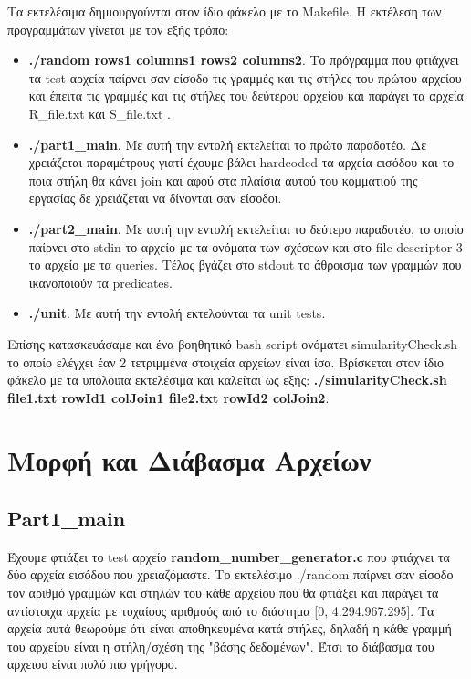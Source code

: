 \documentclass[12pt, a4paper]{article}
\begin{document}
Τα εκτελέσιμα δημιουργούνται στον ίδιο φάκελο με το Makefile. Η εκτέλεση των προγραμμάτων γίνεται με τον εξής τρόπο:
\begin{itemize}
	\item \textbf{./random rows1 columns1 rows2 columns2}. Το πρόγραμμα που φτιάχνει τα test αρχεία παίρνει σαν είσοδο τις γραμμές και τις στήλες του πρώτου αρχείου και έπειτα τις γραμμές και τις στήλες του δεύτερου αρχείου και παράγει τα αρχεία R\_file.txt και S\_file.txt .
	\item \textbf{./part1\_main}. Με αυτή την εντολή εκτελείται το πρώτο παραδοτέο. Δε χρειάζεται παραμέτρους γιατί έχουμε βάλει hardcoded τα αρχεία εισόδου και το ποια στήλη θα κάνει join και αφού στα πλαίσια αυτού του κομματιού της εργασίας δε χρειάζεται να δίνονται σαν είσοδοι.
	\item \textbf{./part2\_main}. Με αυτή την εντολή εκτελείται το δεύτερο παραδοτέο, το οποίο παίρνει στο stdin το αρχείο με τα ονόματα των σχέσεων και στο file descriptor 3 το αρχείο με τα queries. Τέλος βγάζει στο stdout το άθροισμα των γραμμών που ικανοποιούν τα predicates.
	\item \textbf{./unit}. Με αυτή την εντολή εκτελούνται τα unit tests.
\end{itemize}
Επίσης κατασκευάσαμε και ένα βοηθητικό bash script ονόματει simularityCheck.sh το οποίο ελέγχει έαν 2 τετριμμένα στοιχεία αρχείων είναι ίσα. Βρίσκεται στον ίδιο φάκελο με τα υπόλοιπα εκτελέσιμα και καλείται ως εξής: \textbf{./simularityCheck.sh file1.txt rowId1 colJoin1 file2.txt rowId2 colJoin2}.

\section{Μορφή και Διάβασμα Αρχείων}

\subsection {Part1\_main}
Έχουμε φτιάξει το test αρχείο \textbf{random\_number\_generator.c} που φτιάχνει τα δύο αρχεία εισόδου που χρειαζόμαστε. Το εκτελέσιμο ./random παίρνει σαν είσοδο τον αριθμό γραμμών και στηλών του κάθε αρχείου που θα φτιάξει και παράγει τα αντίστοιχα αρχεία με τυχαίους αριθμούς από το διάστημα [0, 4.294.967.295]. Τα αρχεία αυτά θεωρούμε ότι είναι αποθηκευμένα κατά στήλες, δηλαδή η κάθε γραμμή του αρχείου είναι η στήλη/σχέση της "βάσης δεδομένων". Έτσι το διάβασμα του αρχειου είναι πολύ πιο γρήγορο.
\end{document}
